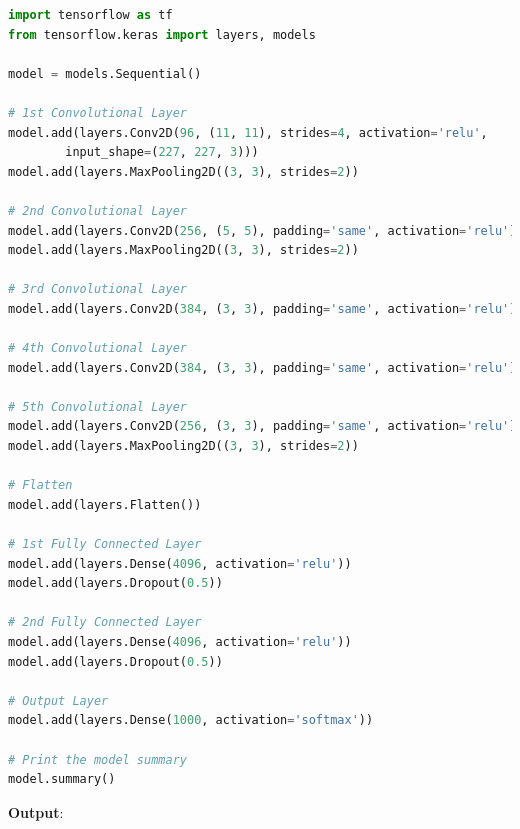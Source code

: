 \begin{lstlisting}[language=Python,caption=AlexNet - tensorflow - Python]
import tensorflow as tf
from tensorflow.keras import layers, models

model = models.Sequential()

# 1st Convolutional Layer
model.add(layers.Conv2D(96, (11, 11), strides=4, activation='relu', 
        input_shape=(227, 227, 3)))
model.add(layers.MaxPooling2D((3, 3), strides=2))

# 2nd Convolutional Layer
model.add(layers.Conv2D(256, (5, 5), padding='same', activation='relu'))
model.add(layers.MaxPooling2D((3, 3), strides=2))

# 3rd Convolutional Layer
model.add(layers.Conv2D(384, (3, 3), padding='same', activation='relu'))

# 4th Convolutional Layer
model.add(layers.Conv2D(384, (3, 3), padding='same', activation='relu'))

# 5th Convolutional Layer
model.add(layers.Conv2D(256, (3, 3), padding='same', activation='relu'))
model.add(layers.MaxPooling2D((3, 3), strides=2))

# Flatten
model.add(layers.Flatten())

# 1st Fully Connected Layer
model.add(layers.Dense(4096, activation='relu'))
model.add(layers.Dropout(0.5))

# 2nd Fully Connected Layer
model.add(layers.Dense(4096, activation='relu'))
model.add(layers.Dropout(0.5))

# Output Layer
model.add(layers.Dense(1000, activation='softmax'))

# Print the model summary
model.summary()
\end{lstlisting}

\textbf{Output}:

